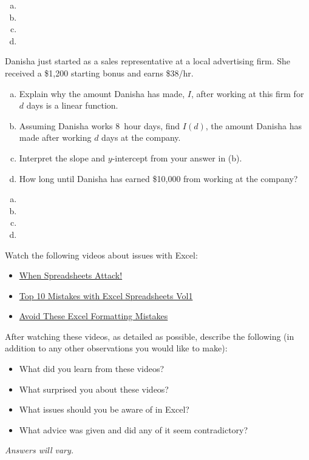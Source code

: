 \documentclass[11pt,letterpaper]{article}
\begin{document}
\sol
\begin{enumerate}[(a)]
\item 
\item 
\item 
\item 
\end{enumerate}



\newpage



 Danisha just started as a sales representative at a local advertising firm. She received a \$1,200 starting bonus and earns \$38/hr. 
	\begin{enumerate}[(a)]
	\item Explain why the amount Danisha has made, $I$, after working at this firm for $d$ days is a linear function.
	\item Assuming Danisha works 8~hour days, find $I(d)$, the amount Danisha has made after working $d$ days at the company. 
	\item Interpret the slope and $y$-intercept from your answer in (b). 
	\item How long until Danisha has earned \$10,000 from working at the company?
	\end{enumerate} \pspace

\sol
\begin{enumerate}[(a)]
\item 
\item 
\item 
\item 
\end{enumerate}



\newpage



 Watch the following videos about issues with Excel:
	\begin{itemize}
	\item \href{https://www.youtube.com/watch?v=yb2zkxHDfUE&ab_channel=Stand-upMaths}{When Spreadsheets Attack!}
	\item \href{https://www.youtube.com/watch?v=3tkz5MNg4FA&ab_channel=QIMacros}{Top 10 Mistakes with Excel Spreadsheets Vol1}
	\item \href{https://www.youtube.com/watch?v=ujExCcncT6k&ab_channel=Pete-HowToAnalyst}{Avoid These Excel Formatting Mistakes}
	\end{itemize}
After watching these videos, as detailed as possible, describe the following (in addition to any other observations you would like to make):
	\begin{itemize}
	\item What did you learn from these videos?
	\item What surprised you about these videos?
	\item What issues should you be aware of in Excel?
	\item What advice was given and did any of it seem contradictory?
	\end{itemize} \pspace

\begin{center}
{\itshape Answers will vary.}
\end{center}
\end{document}
